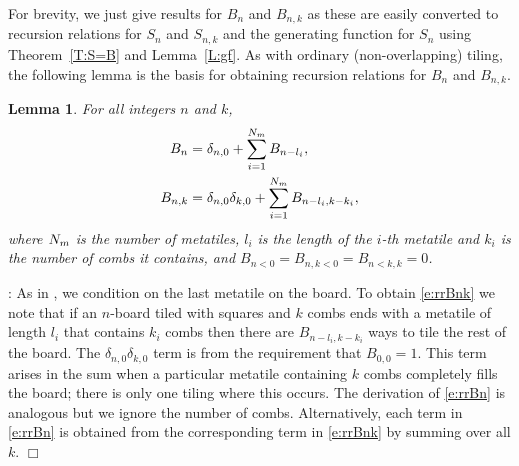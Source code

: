 \documentclass[preprint,3p]{elsarticle}
\newtheorem{lem}{Lemma}
\newcommand{\rb}[1]{_{\rm #1}} %
\newenvironment{proof}[1][]%
{\noindent\textit{\ifthenelse{\equal{#1}{}}{Proof}{Proof #1}}: }%
{\leavevmode\unskip\nobreak\quad\hspace*{\fill}$\Box$\par}
\begin{document}
For brevity, we just give results for $B_n$ and $B_{n,k}$ as these are
easily converted to recursion relations for $S_n$ and $S_{n,k}$ and
the generating function for $S_n$ using Theorem~\ref{T:S=B} and
Lemma~\ref{L:gf}.
As with ordinary (non-overlapping) tiling, the following lemma 
is the basis for obtaining 
recursion relations for $B_n$ and $B_{n,k}$.
\begin{lem}\label{L:rr}
For all integers $n$ and $k$,
\begin{subequations}
\label{e:rr} 
\begin{align}\label{e:rrBn}
B_n&=\delta_{n,0}+\sum_{i=1}^{N\rb{m}}B_{n-l_i},\\
\label{e:rrBnk}
B_{n,k}&=\delta_{n,0}\delta_{k,0}+\sum_{i=1}^{N\rb{m}}B_{n-l_i,k-k_i},
\end{align}
\end{subequations}
where $N\rb{m}$ is the number of metatiles, $l_i$ is the length of the
$i$-th metatile and $k_i$ is the number of combs it contains, and
$B_{n<0}=B_{n,k<0}=B_{n<k,k}=0$.
\end{lem}
\begin{proof}
As in \cite{BQ=03,EA15}, we
condition on the last metatile on the board. To obtain \eqref{e:rrBnk}
we note that if an $n$-board tiled with squares and $k$ combs ends
with a metatile of length $l_i$ that contains $k_i$ combs then there
are $B_{n-l_i,k-k_i}$ ways to tile the rest of the board. The
$\delta_{n,0}\delta_{k,0}$ term is from the requirement that
$B_{0,0}=1$. This term arises in the sum when a particular metatile containing
$k$ combs completely fills the board; there is only one tiling where this
occurs. The derivation of \eqref{e:rrBn} is analogous but we ignore
the number of combs. Alternatively, each term in \eqref{e:rrBn} is
obtained from the corresponding term in \eqref{e:rrBnk} by summing
over all $k$.
\end{proof}
\end{document}
